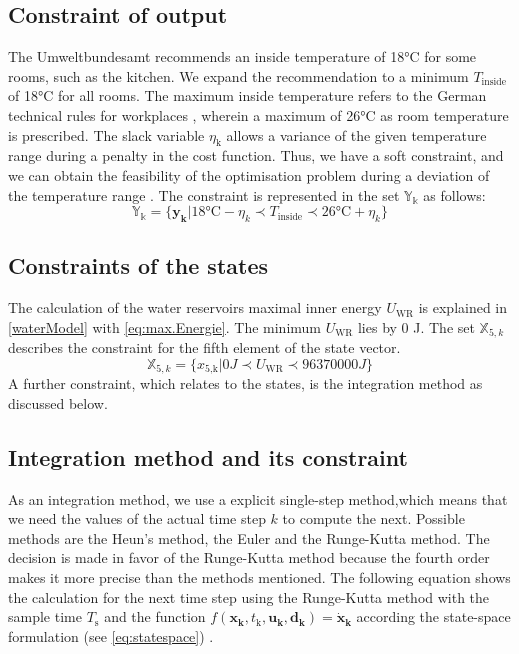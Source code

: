 \subsection{Constraint of output}
\label{subsec:constrainY}
The Umweltbundesamt \cite{Umweltbundesamt.7.10.2021} recommends an inside temperature of 18°C for some rooms, such as the kitchen. We expand the recommendation to a minimum $T_\text{inside}$ of 18°C for all rooms. The maximum inside temperature refers to the German technical rules for workplaces \cite{Bund.2021}, wherein a maximum of 26°C as room temperature is prescribed. The slack variable $\eta_\text{k}$ allows a variance of the given temperature range during a penalty in the cost function. Thus, we have a soft constraint, and we can obtain the feasibility of the optimisation problem during a deviation of the temperature range \cite{Drgona.2020}. The constraint is represented in the set $\mathbb{Y_k}$ as follows:  
\begin{equation}
    \label{ConstraintY}
    \mathbb{Y_k} = \{\mathbf{y_k}| 18 \text{°C} - \eta_k \prec T_\text{inside} \prec 26 \text{°C}+ \eta_k\} 
\end{equation}

\subsection{Constraints of the states}
\label{ConstraintX}
The calculation of the water reservoirs maximal inner energy $U_\text{WR}$ is explained in \autoref{waterModel} with \autoref{eq:max.Energie}. The minimum $U_\text{WR}$ lies by 0 J. The set $\mathbb{X}_{5,k}$ describes the constraint for the fifth element of the state vector.
\begin{equation}
    \label{ConstraintX5}
    \mathbb{X}_{5,k} = \{x_\text{5,k}| 0 J \prec U_\text{WR} \prec 96370000 J\} 
\end{equation}
A further constraint, which relates to the states, is the integration method as discussed below.

\subsection{Integration method and its constraint}
\label{COnstaintIntegration}
As an integration method, we use a explicit single-step method,which means that we need the values of the actual time step $k$ to compute the next. Possible methods are the Heun's method, the Euler and the Runge-Kutta method. The decision is made in favor of the Runge-Kutta method because the fourth order makes it more precise than the methods mentioned. The following equation shows the calculation for the next time step using the Runge-Kutta method with the sample time $T_\text{s}$ and the function $f(\mathbf{x_k},t_\text{k},\mathbf{u_k},\mathbf{d_k}) = \mathbf{\dot{x}_\text{k}}$ according the state-space formulation (see \autoref{eq:statespace}) \cite{KaiFurmansMarcusGeimerBalazsPritzCarstenProppe.WS1920}.

